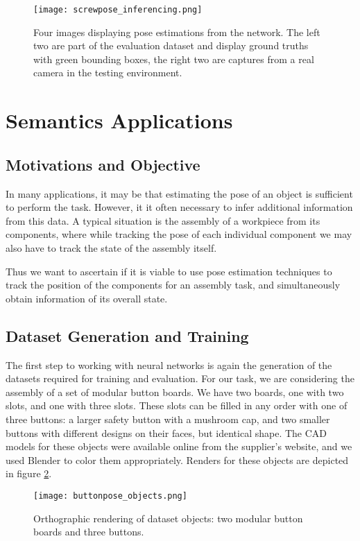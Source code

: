 \begin{figure}[ht]
    \texttt{[image: screwpose\_inferencing.png]}
    \caption{Four images displaying pose estimations from the network. The left two are part of the evaluation dataset and display ground truths with green bounding boxes, the right two are captures from a real camera in the testing environment.}
    \label{fig:screwpose_inferencing}
\end{figure}

\section{Semantics Applications}

\subsection{Motivations and Objective}

In many applications, it may be that estimating the pose of an object is sufficient to perform the task. However, it it often necessary to infer additional information from this data. A typical situation is the assembly of a workpiece from its components, where while tracking the pose of each individual component we may also have to track the state of the assembly itself.

Thus we want to ascertain if it is viable to use pose estimation techniques to track the position of the components for an assembly task, and simultaneously obtain information of its overall state.

\subsection{Dataset Generation and Training}

The first step to working with neural networks is again the generation of the datasets required for training and evaluation. For our task, we are considering the assembly of a set of modular button boards. We have two boards, one with two slots, and one with three slots. These slots can be filled in any order with one of three buttons: a larger safety button with a mushroom cap, and two smaller buttons with different designs on their faces, but identical shape. The CAD models for these objects were available online from the supplier's website, and we used Blender to color them appropriately. Renders for these objects are depicted in figure \ref{fig:buttonpose_objects}.

\begin{figure}[ht]
    \texttt{[image: buttonpose\_objects.png]}
    \caption{Orthographic rendering of dataset objects: two modular button boards and three buttons.}
    \label{fig:buttonpose_objects}
\end{figure}


